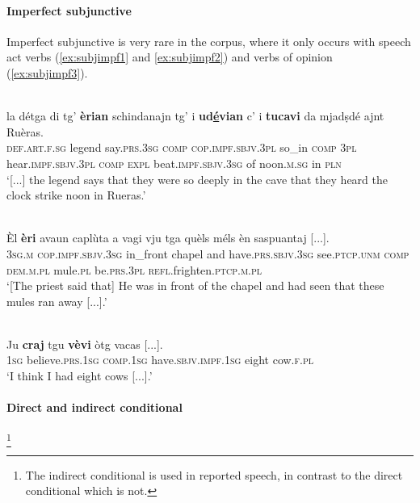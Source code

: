 \paragraph{Imperfect subjunctive}
Imperfect subjunctive is very rare in the corpus, where it only occurs with speech act verbs (\ref{ex:subjimpf1} and \ref{ex:subjimpf2}) and verbs of opinion (\ref{ex:subjimpf3}).

\ea
\label{ex:subjimpf1}
\\
\gll [...] la détga di tg’ \textbf{èrian} schindanajn tg' i \textbf{ud\underline{é}vian} c’ i \textbf{tucavi} da mjadṣdé ajnt Ruèras.\\
{} \textsc{def.art.f.sg} legend say.\textsc{prs.3sg}  \textsc{comp} \textsc{cop.impf.sbjv.3pl} so\_in \textsc{comp} \textsc{3pl} hear.\textsc{impf.sbjv.3pl} \textsc{comp} \textsc{expl} beat.\textsc{impf.sbjv.3sg} of noon.\textsc{m.sg} in \textsc{pln}\\
\glt `[...] the legend says that they were so deeply in the cave that they heard the clock strike noon in Rueras.'
\z

\ea
\label{ex:subjimpf2}
\\
\gll  Èl \textbf{èri} avaun caplùta a vagi vju tga quèls méls èn saspuantaj [...].  \\
\textsc{3sg.m} \textsc{cop.impf.sbjv.3sg} in\_front chapel and have.\textsc{prs.sbjv.3sg} see.\textsc{ptcp.unm} \textsc{comp} \textsc{dem.m.pl} mule.\textsc{pl} be.\textsc{prs.3pl} \textsc{refl.}frighten.\textsc{ptcp.m.pl}\\
\glt `[The priest said that] He was in front of the chapel and had seen that these mules ran away [...].'
\z

\ea
\label{ex:subjimpf3}
\\
\gll Ju \textbf{craj} tgu \textbf{vèvi} òtg vacas [...].\\
\textsc{1sg} believe.\textsc{prs.1sg} \textsc{comp.1sg} have.\textsc{sbjv.impf.1sg} eight cow.\textsc{f.pl}\\
\glt `I think I had eight cows [...].'
\z

\paragraph{Direct and indirect conditional}\footnote{The indirect conditional is used in reported speech, in contrast to the direct conditional which is not.}

